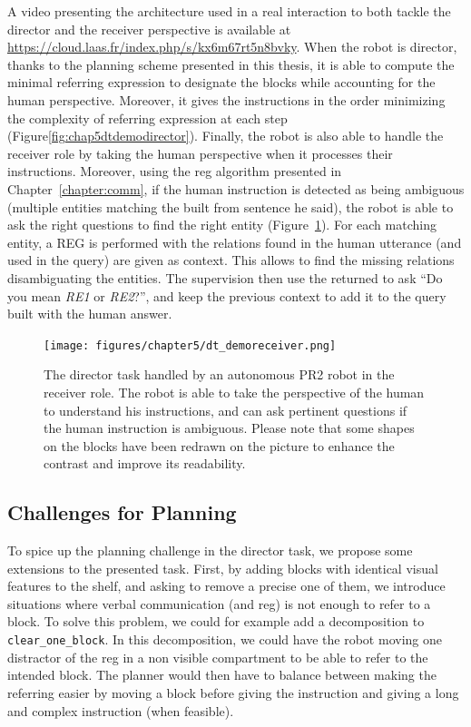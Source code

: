 \documentclass[a4paper,11pt,twoside]{StyleThese}
\begin{document}
A video presenting the architecture used in a real interaction to both tackle the director and the receiver perspective is available at \url{https://cloud.laas.fr/index.php/s/kx6m67rt5n8bvky}. When the robot is director, thanks to the planning scheme presented in this thesis, it is able to compute the minimal referring expression to designate the blocks while accounting for the human perspective. Moreover, it gives the instructions in the order minimizing the complexity of referring expression at each step (Figure\ref{fig:chap5dtdemodirector}). Finally, the robot is also able to handle the receiver role  by taking the human perspective when it processes their instructions. Moreover, using the \acrshort{reg} algorithm presented in Chapter~\ref{chapter:comm}, if the human instruction is detected as being ambiguous (multiple entities matching the \sparql{} built from sentence he said), the robot is able to ask the right questions to find the right entity (Figure~\ref{fig:chap5dtdemoreceiver}). For each matching entity, a REG is performed with the relations found in the human utterance (and used in the \sparql{} query) are given as context. This allows to find the missing relations disambiguating the entities. The supervision then use the  returned to ask ``Do you mean \textit{RE1} or \textit{RE2}?'', and keep the previous context to add it to the \sparql{} query built with the human answer.

\begin{figure}[hbtp]
\centering
\texttt{[image: figures/chapter5/dt\_demoreceiver.png]}
\caption{The director task handled by an autonomous PR2 robot in the receiver role. The robot is able to take the perspective of the human to understand his instructions, and can ask pertinent questions if the human instruction is ambiguous. Please note that some shapes on the blocks have been redrawn on the picture to enhance the contrast and improve its readability.}
\label{fig:chap5dtdemoreceiver}
\end{figure}

\subsection{Challenges for Planning}
To spice up the planning challenge in the director task, we propose some extensions to the presented task.
First, by adding blocks with identical visual features to the shelf, and asking to remove a precise one of them, we introduce situations where verbal communication (and \acrshort{reg}) is not enough to refer to a block. To solve this problem, we could for example add a decomposition to \verb'clear_one_block'. In this decomposition, we could have the robot moving one distractor of the \acrshort{reg} in a non visible compartment to be able to refer to the intended block. The planner would then have to balance between making the referring easier by moving a block before giving the instruction and giving a long and complex instruction (when feasible).
\end{document}
